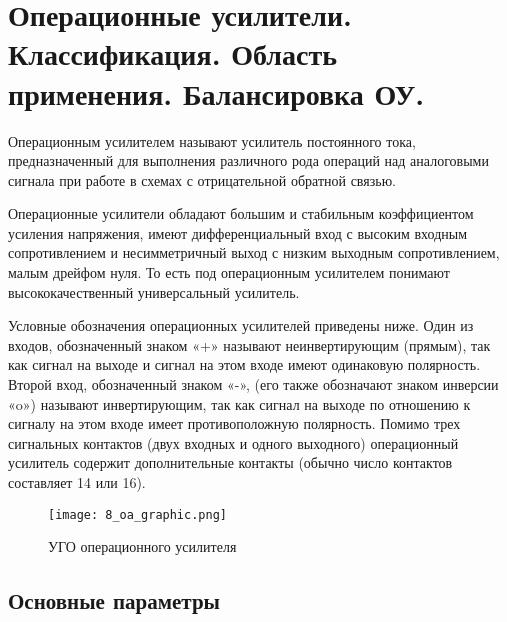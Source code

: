\section{Операционные усилители. Классификация. Область применения. Балансировка ОУ.}

Операционным усилителем называют усилитель постоянного тока, предназначенный для выполнения различного рода операций над аналоговыми сигнала при работе в схемах с отрицательной обратной связью.

Операционные усилители обладают большим и стабильным коэффициентом усиления напряжения, имеют дифференциальный вход с высоким входным сопротивлением и несимметричный выход с низким выходным сопротивлением, малым дрейфом нуля. То есть под операционным усилителем понимают высококачественный универсальный усилитель.

Условные обозначения операционных усилителей приведены ниже. Один из входов, обозначенный знаком «+» называют неинвертирующим (прямым), так как сигнал на выходе и сигнал на этом входе имеют одинаковую полярность. Второй вход, обозначенный знаком «-», (его также обозначают знаком инверсии «o») называют инвертирующим, так как сигнал на выходе по отношению к сигналу на этом входе имеет противоположную полярность. Помимо трех сигнальных контактов (двух входных и одного выходного) операционный усилитель содержит дополнительные контакты (обычно число контактов составляет 14 или 16).

\begin{figure}[H]
\centering
\texttt{[image: 8\_oa\_graphic.png]}
\caption{УГО операционного усилителя}
\label{fig:8_oa_graphic}
\end{figure}

\subsection*{Основные параметры}

